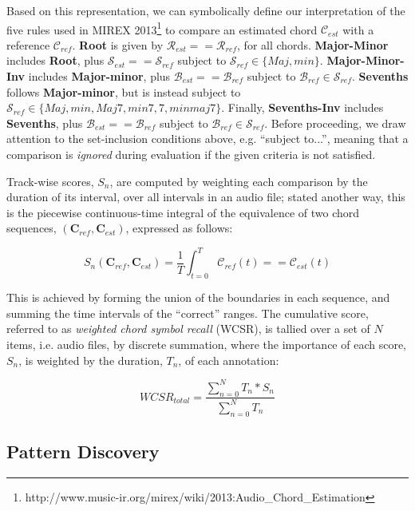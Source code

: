 \documentclass{article}
\begin{document}
Based on this representation, we can symbolically define our interpretation of the five rules used in MIREX 2013\footnote{http://www.music-ir.org/mirex/wiki/2013:Audio\_Chord\_Estimation} to compare an estimated chord $\mathcal{C}_{est}$ with a reference $\mathcal{C}_{ref}$.
\textbf{Root} is given by $\mathcal{R}_{est} == \mathcal{R}_{ref}$, for all chords.
\textbf{Major-Minor} includes \textbf{Root}, plus $\mathcal{S}_{est} == \mathcal{S}_{ref}$ subject to $\mathcal{S}_{ref} \in \{Maj, min\}$.
\textbf{Major-Minor-Inv} includes \textbf{Major-minor}, plus $\mathcal{B}_{est} == \mathcal{B}_{ref}$ subject to $\mathcal{B}_{ref} \in \mathcal{S}_{ref}$.
\textbf{Sevenths} follows \textbf{Major-minor}, but is instead subject to $\mathcal{S}_{ref} \in \{Maj, min, Maj7, min7, 7, minmaj7\}$.
Finally, \textbf{Sevenths-Inv} includes \textbf{Sevenths}, plus $\mathcal{B}_{est} == \mathcal{B}_{ref}$ subject to $\mathcal{B}_{ref} \in \mathcal{S}_{ref}$.
Before proceeding, we draw attention to the set-inclusion conditions above, e.g. ``subject to...'', meaning that a comparison is \emph{ignored} during evaluation if the given criteria is not satisfied.

Track-wise scores, $S_n$, are computed by weighting each comparison by the duration of its interval, over all intervals in an audio file; stated another way, this is the piecewise continuous-time integral of the equivalence of two chord sequences, $(\mathbf{C}_{ref}, \mathbf{C}_{est})$, expressed as follows:

\begin{equation}
S_n(\mathbf{C}_{ref}, \mathbf{C}_{est}) = \frac{1}{T}\int_{t=0}^{T} \mathcal{C}_{ref}(t) == \mathcal{C}_{est}(t)
\end{equation}

\noindent This is achieved by forming the union of the boundaries in each sequence, and summing the time intervals of the ``correct'' ranges. 
The cumulative score, referred to as \emph{weighted chord symbol recall} (WCSR), is tallied over a set of $N$ items, i.e. audio files, by discrete summation, where the importance of each score, $S_n$, is weighted by the duration, $T_n$, of each annotation:

\begin{equation}
WCSR_{total} = \frac{\sum_{n=0}^{N} T_n*S_n}{\sum_{n=0}^{N} T_n}
\end{equation}
 
\subsection{Pattern Discovery}
\end{document}
